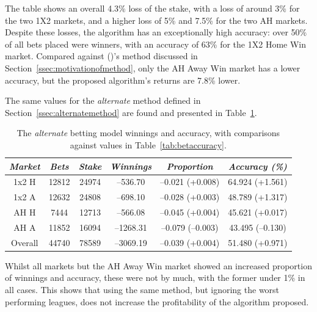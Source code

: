 \documentclass[a4paper,10pt]{report}
\begin{document}
The table shows an overall 4.3\% loss of the stake, with a loss of around 3\% for the two 1X2 markets, and a higher loss of 5\% and 7.5\% for the two AH markets. Despite these losses, the algorithm has an exceptionally high accuracy: over 50\% of all bets placed were winners, with an accuracy of 63\% for the 1X2 Home Win market. Compared against \citeauthor{kaunitz17} (\citeyear{kaunitz17})'s method discussed in Section~\ref{ssec:motivationofmethod}, only the AH Away Win market has a lower accuracy, but the proposed algorithm's returns are 7.8\% lower. 

The same values for the \textit{alternate} method defined in Section~\ref{ssec:alternatemethod} are found and presented in Table~\ref{tab:betaccuracyalternate}.

\begin{table}[h!]\begin{center}\begin{tabular}{c||cc|cc|c}
\textit{Market}	& \textit{Bets} & \textit{Stake}	& \textit{Winnings}	& \textit{Proportion}& \textit{Accuracy (\%)}  \\ \hline\hline
1x2 H	&12812	&24974	&--536.70	&--0.021 (+0.008)	&64.924 (+1.561)\\
1x2 A	&12632	&24808	&--698.10	&--0.028 (+0.003)	&48.789 (+1.317)\\
AH H	&7444	&12713	&--566.08	&--0.045 (+0.004)	&45.621 (+0.017)\\
AH A	&11852	&16094	&--1268.31	&--0.079 (--0.003)	&43.495 (--0.130)\\\hdashline
Overall	&44740	&78589	&--3069.19	&--0.039 (+0.004)	&51.480 (+0.971)
\end{tabular}\end{center}\caption{The \textit{alternate} betting model winnings and accuracy, with comparisons against values in Table~\ref{tab:betaccuracy}.}\label{tab:betaccuracyalternate}
\end{table}


Whilst all markets but the AH Away Win market showed an increased proportion of winnings and accuracy, these were not by much, with the former under 1\% in all cases. This shows that using the same method, but ignoring the worst performing leagues, does not increase the profitability of the algorithm proposed.
\end{document}
